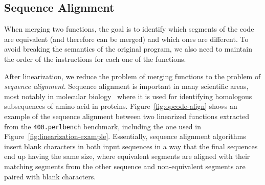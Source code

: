 

\subsection{Sequence Alignment}

When merging two functions, the goal is to identify which segments of the code are equivalent (and therefore can be merged) and which ones are different.
To avoid breaking the semantics of the original program, we also need to maintain the order of the instructions for each one of the functions.

After linearization, we reduce the problem of merging functions to the problem of \textit{sequence alignment}. Sequence alignment is important in many scientific areas, most notably in molecular biology~\cite{needleman70,smith81,carrillo88,wang94} where it is used for identifying homologous subsequences of amino acid in proteins.
Figure~\ref{fig:opcode-align} shows an example of
the sequence alignment between two linearized functions extracted from the \texttt{400.perlbench} benchmark, including the one used in
Figure~\ref{fig:linearization-example}.
Essentially, sequence alignment algorithms insert blank characters in both input sequences in a way that
the final sequences end up having the same size, where equivalent segments are aligned with their matching segments from the other sequence
and non-equivalent segments are paired with blank characters.

